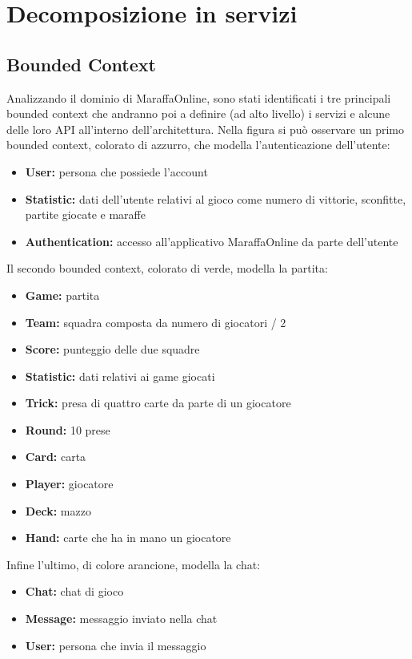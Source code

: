 \newpage 

\section{Decomposizione in servizi}


\subsection{Bounded Context}
Analizzando il dominio di MaraffaOnline, sono stati identificati i tre principali bounded context che andranno poi a definire (ad alto livello) i servizi e alcune delle loro API all'interno dell'architettura.
Nella figura si può osservare un primo bounded context, colorato di azzurro, che modella l'autenticazione dell'utente:
    \begin{itemize}
        \item \textbf{User:} persona che possiede l'account
        \item \textbf{Statistic:} dati dell'utente relativi al gioco come numero di vittorie, sconfitte, partite giocate e maraffe
        \item \textbf{Authentication:} accesso all'applicativo MaraffaOnline da parte dell'utente
    \end{itemize}
Il secondo bounded context, colorato di verde, modella la partita:
    \begin{itemize}
        \item \textbf{Game:} partita
        \item \textbf{Team:} squadra composta da numero di giocatori / 2
        \item \textbf{Score:} punteggio delle due squadre
        \item \textbf{Statistic:} dati relativi ai game giocati
        \item \textbf{Trick:} presa di quattro carte da parte di un giocatore
        \item \textbf{Round:} 10 prese
        \item \textbf{Card:} carta
        \item \textbf{Player:} giocatore
        \item \textbf{Deck:} mazzo
        \item \textbf{Hand:} carte che ha in mano un giocatore
    \end{itemize}
Infine l'ultimo, di colore arancione, modella la chat:
    \begin{itemize}
        \item \textbf{Chat:} chat di gioco
        \item \textbf{Message:} messaggio inviato nella chat
        \item \textbf{User:} persona che invia il messaggio
    \end{itemize}
